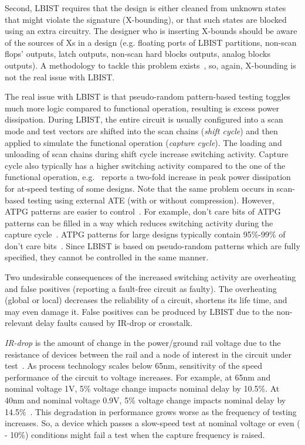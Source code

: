 \documentclass[conference]{IEEEtran}
\begin{document}
Second, LBIST requires that the design is either cleaned from unknown states that might violate the signature (X-bounding), or that such states are blocked using an extra circuitry. 
The designer who is inserting X-bounds should be aware of the sources of Xs in a design (e.g. floating ports of LBIST partitions, non-scan flops' outputs, latch outputs, non-scan hard blocks outputs, analog blocks outputs). A methodology to tackle this problem exists~\cite{Xbound}, so, again, X-bounding is not the real issue with LBIST.
 
The real issue with LBIST is that pseudo-random pattern-based testing 
toggles much more logic compared to functional operation, resulting is excess power dissipation.
During LBIST, the entire circuit is usually configured into a scan mode and test vectors are shifted into the scan chains ({\em shift cycle}) and then applied to simulate the functional operation ({\em capture cycle}). The loading and unloading of scan chains during shift cycle increase switching activity. Capture cycle also typically has a higher switching activity compared to the one of the functional operation, e.g.~\cite{Sa03} reports a two-fold increase in peak power dissipation for at-speed testing of some designs. Note that the same problem occurs in scan-based testing using external ATE (with or without compression). However, ATPG patterns are easier to control~\cite{BuSJ04,LiRP05}. For example, don't care bits of ATPG patterns can be filled in a way which reduces switching activity during the capture cycle~\cite{WeYM05,ReXZ06,WeNM12}. 
ATPG patterns for large designs typically contain 95\%-99\% of don't care bits~\cite{WaC05}.
Since LBIST is based on pseudo-random patterns which are fully specified, they cannot be controlled in the same manner.

Two undesirable consequences of the increased switching activity are overheating and false positives (reporting a fault-free circuit as faulty). The overheating (global or local) decreases the reliability of a circuit, shortens its life time, and may even damage it. False positives can be produced by LBIST due to the non-relevant delay faults caused by IR-drop or crosstalk. 

{\em IR-drop} is the amount of change in the power/ground rail voltage due to the resistance of devices between the rail and a node of interest in the circuit under test~\cite{Sa03}. As process technology scales below 65nm, sensitivity of the speed performance of the circuit to voltage increases. For example, at 65nm and nominal voltage 1V, 5\% voltage change impacts nominal delay by 10.5\%. At 40nm and nominal voltage 0.9V, 5\% voltage change impacts nominal delay by 14.5\%~\cite{Kr08}. This degradation in performance grows worse as the frequency of testing increases. So, a device which passes a slow-speed test at nominal voltage or even  ( - 10\%) conditions might fail a test when the capture frequency is raised.
\end{document}
